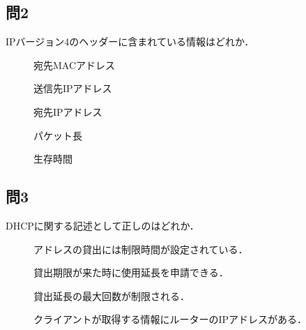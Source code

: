 \documentclass[paper=a4,10pt,twocolumn]{jlreq}
\begin{document}
\subsection*{問2}
IPバージョン4のヘッダーに含まれている情報はどれか．
\begin{description}
    \item[\bt] 宛先MACアドレス
    \item[\ci] 送信先IPアドレス
    \item[\ci] 宛先IPアドレス
    \item[\ci] パケット長
    \item[\ci] 生存時間
\end{description}
\subsection*{問3}
DHCPに関する記述として正しのはどれか．
\begin{description}
    \item[\ci] アドレスの貸出には制限時間が設定されている．
    \item[\ci] 貸出期限が来た時に使用延長を申請できる．
    \item[\bt] 貸出延長の最大回数が制限される．
    \item[\ci] クライアントが取得する情報にルーターのIPアドレスがある．
\end{description}
\end{document}
